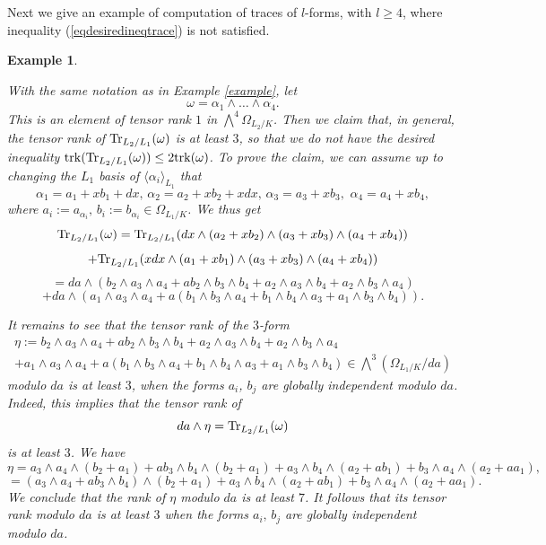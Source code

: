 \documentclass[10pt]{article}
\newtheorem{ex}[theo]{Example}
\begin{document}
Next we  give an example of  computation  of traces of $l$-forms, with $l\geq4$, where inequality (\ref{eqdesiredineqtrace}) is not satisfied.
\begin{ex}\label{exampleell} {\rm  With the same notation as in Example \ref{example}, let
$$\omega=\alpha_1\wedge\ldots\wedge \alpha_4.$$ This is an element of tensor rank $1$ in $\bigwedge^4\Omega_{L_2/K} $. Then we claim that, in general, the tensor rank of ${\rm Tr}_{L_2/L_1}(\omega)$ is at least $ 3$, so that we do not have the desired inequality ${\rm trk}({\rm Tr}_{L_2/L_1}(\omega))\leq 2{\rm trk}(\omega)$.
To prove the claim, we can assume up to changing the $L_1$ basis of $\langle \alpha_i\rangle_{L_1}$ that
$$\alpha_1=a_1+x b_1+  dx,\,\alpha_2=a_2+x b_2+  xdx,\,\alpha_3=a_3+x b_3,\,\,\alpha_4=a_4+x b_4,$$
where $a_i:=a_{\alpha_i},\,b_i:=b_{\alpha_i}\in \Omega_{L_1/K}$.
We thus get
$${\rm Tr}_{L_2/L_1}(\omega)={\rm Tr}_{L_2/L_1}(dx\wedge(a_2+x b_2)\wedge (a_3+x b_3)\wedge(a_4+x b_4))$$
$$+
{\rm Tr}_{L_2/L_1}(xdx\wedge (a_1+x b_1)\wedge (a_3+x b_3)\wedge(a_4+x b_4))$$
$$=da\wedge (b_2\wedge a_3\wedge a_4+ab_2\wedge b_3\wedge b_4+a_2\wedge a_3\wedge b_4+a_2\wedge b_3\wedge a_4)$$
$$+da\wedge(a_1\wedge a_3\wedge a_4+a(b_1\wedge b_3\wedge a_4+b_1\wedge b_4\wedge a_3+a_1\wedge b_3\wedge b_4)).$$

It remains to see that the tensor rank of the $3$-form
\begin{eqnarray}\nonumber \eta:= b_2\wedge a_3\wedge a_4+ab_2\wedge b_3\wedge b_4+a_2\wedge a_3\wedge b_4+a_2\wedge b_3\wedge a_4\\ \nonumber
+a_1\wedge a_3\wedge a_4+a(b_1\wedge b_3\wedge a_4+b_1\wedge b_4\wedge a_3+a_1\wedge b_3\wedge b_4)\in \bigwedge^3(\Omega_{L_1/K}/da)\end{eqnarray} modulo $da$ is at least $ 3$, when the forms $a_i$, $b_j$ are globally independent modulo $da$. Indeed, this implies that the tensor rank of $$da\wedge\eta={\rm Tr}_{L_2/L_1}(\omega)$$ is at least $3$. We have
$$\eta=a_3\wedge a_4\wedge(b_2+a_1) +ab_3\wedge b_4\wedge(b_2+a_1)+a_3\wedge b_4\wedge(a_2+ab_1 )+b_3\wedge a_4\wedge(a_2+aa_1),$$
$$=(a_3\wedge a_4+ab_3\wedge b_4)\wedge (b_2+a_1)+a_3\wedge b_4\wedge(a_2+ab_1 )+b_3\wedge a_4\wedge(a_2+aa_1).$$
We conclude that the rank of $\eta$ modulo $da$ is at least $ 7$. It follows  that its tensor rank modulo $da$ is at least $ 3$ when the forms $ a_i, \,b_j$ are globally independent modulo $da$.

}

\end{ex}
\end{document}
